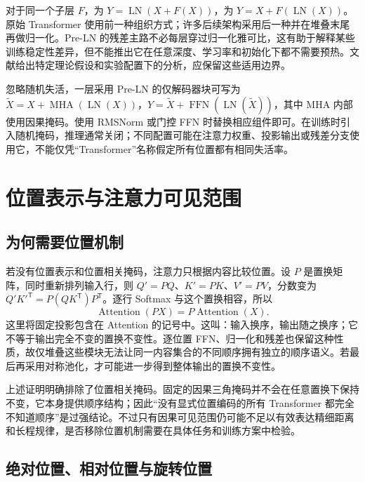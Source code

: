 \documentclass[UTF8,12pt,a4paper,fontset=fandol]{ctexart}
\begin{document}
对于同一个子层 $F$，为 $Y=\operatorname{LN}(X+F(X))$，为 $Y=X+F(\operatorname{LN}(X))$。原始 Transformer 使用前一种组织方式；许多后续架构采用后一种并在堆叠末尾再做归一化。Pre-LN 的残差主路不必每层穿过归一化雅可比，这有助于解释某些训练稳定性差异，但不能推出它在任意深度、学习率和初始化下都不需要预热。文献\cite{xiong2020}给出特定理论假设和实验配置下的分析，应保留这些适用边界。

忽略随机失活，一层采用 Pre-LN 的仅解码器块可写为 $\widetilde X=X+\operatorname{MHA}(\operatorname{LN}(X))$，$Y=\widetilde X+\operatorname{FFN}(\operatorname{LN}(\widetilde X))$，其中 MHA 内部使用因果掩码。使用 RMSNorm 或门控 FFN 时替换相应组件即可。在训练时引入随机掩码，推理通常关闭；不同配置可能在注意力权重、投影输出或残差分支使用它，不能仅凭“Transformer”名称假定所有位置都有相同失活率。

\section{位置表示与注意力可见范围}
\label{sec:tr-position}

\subsection{为何需要位置机制}

若没有位置表示和位置相关掩码，注意力只根据内容比较位置。设 $P$ 是置换矩阵，同时重新排列输入行，则 $Q'=PQ$、$K'=PK$、$V'=PV$，分数变为 $Q'K'^{\mathsf T}=P(QK^{\mathsf T})P^{\mathsf T}$。逐行 Softmax 与这个置换相容，所以
\begin{equation}
\operatorname{Attention}(PX)=P\operatorname{Attention}(X).
\label{eq:tr-permutation}
\end{equation}
这里将固定投影包含在 Attention 的记号中。这叫：输入换序，输出随之换序；它不等于输出完全不变的置换不变性。逐位置 FFN、归一化和残差也保留这种性质，故仅堆叠这些模块无法让同一内容集合的不同顺序拥有独立的顺序语义。若最后再采用对称池化，才可能进一步得到整体输出的置换不变性。

上述证明明确排除了位置相关掩码。固定的因果三角掩码并不会在任意置换下保持不变，它本身提供顺序结构；因此“没有显式位置编码的所有 Transformer 都完全不知道顺序”是过强结论。不过只有因果可见范围仍可能不足以有效表达精细距离和长程规律，是否移除位置机制需要在具体任务和训练方案中检验。

\subsection{绝对位置、相对位置与旋转位置}
\end{document}
